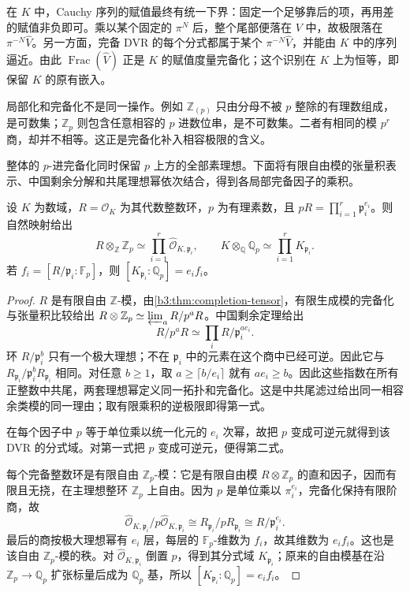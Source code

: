 在 \(K\) 中，Cauchy 序列的赋值最终有统一下界：固定一个足够靠后的项，再用差的赋值非负即可。乘以某个固定的 \(\pi^N\) 后，整个尾部便落在 \(V\) 中，故极限落在 \(\pi^{-N}\widehat V\)。另一方面，完备 DVR 的每个分式都属于某个 \(\pi^{-N}\widehat V\)，并能由 \(K\) 中的序列逼近。由此 \(\operatorname{Frac}(\widehat V)\) 正是 \(K\) 的赋值度量完备化；这个识别在 \(K\) 上为恒等，即保留 \(K\) 的原有嵌入。

\ProseParagraphBreak
局部化和完备化不是同一操作。例如 \(\mathbb Z_{(p)}\) 只由分母不被 \(p\) 整除的有理数组成，是可数集；\(\mathbb Z_p\) 则包含任意相容的 \(p\) 进数位串，是不可数集。二者有相同的模 \(p^r\) 商，却并不相等。这正是完备化补入相容极限的含义。

整体的 \(p\)-进完备化同时保留 \(p\) 上方的全部素理想。下面将有限自由模的张量积表示、中国剩余分解和共尾理想幂依次结合，得到各局部完备因子的乘积。

\begin{theorem}\label{b3:thm:number-field-completion-product}
	设 \(K\) 为数域，\(R=\mathcal O_K\) 为其代数整数环，\(p\) 为有理素数，且 \(pR=\prod_{i=1}^r\mathfrak p_i^{e_i}\)。则自然映射给出
	\[
		R\otimes_{\mathbb Z}\mathbb Z_p \simeq\prod_{i=1}^r\widehat{\mathcal O}_{K,\mathfrak p_i}, \qquad K\otimes_{\mathbb Q}\mathbb Q_p \simeq\prod_{i=1}^rK_{\mathfrak p_i}.
	\]
	若 \(f_i=[R/\mathfrak p_i:\mathbb F_p]\)，则 \([K_{\mathfrak p_i}:\mathbb Q_p]=e_if_i\)。
\end{theorem}
\begin{proof}
	\(R\) 是有限自由 \(\mathbb Z\)-模，由\cref{b3:thm:completion-tensor}，有限生成模的完备化与张量积比较给出 \(R\otimes\mathbb Z_p\simeq\varprojlim_a R/p^aR\)。中国剩余定理给出
	\[
		R/p^aR\simeq\prod_i R/\mathfrak p_i^{ae_i}.
	\]
	环 \(R/\mathfrak p_i^b\) 只有一个极大理想；不在 \(\mathfrak p_i\) 中的元素在这个商中已经可逆。因此它与 \(R_{\mathfrak p_i}/\mathfrak p_i^bR_{\mathfrak p_i}\) 相同。对任意 \(b\ge1\)，取 \(a\ge\lceil b/e_i\rceil\) 就有 \(ae_i\ge b\)。因此这些指数在所有正整数中共尾，两套理想幂定义同一拓扑和完备化。这是中共尾滤过给出同一相容余类模的同一理由；取有限乘积的逆极限即得第一式。

	在每个因子中 \(p\) 等于单位乘以统一化元的 \(e_i\) 次幂，故把 \(p\) 变成可逆元就得到该 DVR 的分式域。对第一式把 \(p\) 变成可逆元，便得第二式。

	每个完备整数环是有限自由 \(\mathbb Z_p\)-模：它是有限自由模 \(R\otimes\mathbb Z_p\) 的直和因子，因而有限且无挠，在主理想整环 \(\mathbb Z_p\) 上自由。因为 \(p\) 是单位乘以 \(\pi_i^{e_i}\)，完备化保持有限阶商，故
	\[
		\widehat{\mathcal O}_{K,\mathfrak p_i}/p\widehat{\mathcal O}_{K,\mathfrak p_i} \cong R_{\mathfrak p_i}/pR_{\mathfrak p_i} \cong R/\mathfrak p_i^{e_i}.
	\]
	最后的商按极大理想幂有 \(e_i\) 层，每层的 \(\mathbb F_p\)-维数为 \(f_i\)，故其维数为 \(e_if_i\)。这也是该自由 \(\mathbb Z_p\)-模的秩。对 \(\widehat{\mathcal O}_{K,\mathfrak p_i}\) 倒置 \(p\)，得到其分式域 \(K_{\mathfrak p_i}\)；原来的自由模基在沿 \(\mathbb Z_p\to\mathbb Q_p\) 扩张标量后成为 \(\mathbb Q_p\) 基，所以 \([K_{\mathfrak p_i}:\mathbb Q_p]=e_if_i\)。
\end{proof}

